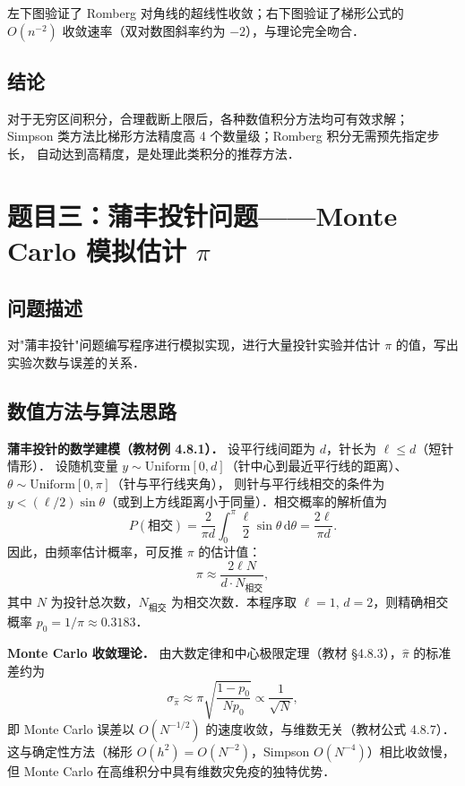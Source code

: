 \documentclass[UTF8,a4paper,11pt]{article}
\begin{document}
左下图验证了 Romberg 对角线的超线性收敛；右下图验证了梯形公式的 $O(n^{-2})$ 收敛速率（双对数图斜率约为 $-2$），与理论完全吻合．

\subsection{结论}

对于无穷区间积分，合理截断上限后，各种数值积分方法均可有效求解；
Simpson 类方法比梯形方法精度高 4 个数量级；Romberg 积分无需预先指定步长，
自动达到高精度，是处理此类积分的推荐方法．

\clearpage

\section{题目三：蒲丰投针问题——Monte Carlo 模拟估计 $\pi$}

\subsection{问题描述}

对"蒲丰投针"问题编写程序进行模拟实现，进行大量投针实验并估计 $\pi$ 的值，写出实验次数与误差的关系．

\subsection{数值方法与算法思路}

\noindent\textbf{蒲丰投针的数学建模（教材例 4.8.1）．}
设平行线间距为 $d$，针长为 $\ell\leq d$（短针情形）．
设随机变量 $y\sim\mathrm{Uniform}[0,d]$（针中心到最近平行线的距离）、$\theta\sim\mathrm{Uniform}[0,\pi]$（针与平行线夹角），
则针与平行线相交的条件为 $y<(\ell/2)\sin\theta$（或到上方线距离小于同量）．相交概率的解析值为
$$P(\text{相交}) = \frac{2}{\pi d}\int_0^{\pi}\frac{\ell}{2}\sin\theta\,\mathrm{d}\theta = \frac{2\ell}{\pi d}.$$
因此，由频率估计概率，可反推 $\pi$ 的估计值：
$$\pi \approx \frac{2\ell N}{d\cdot N_{\text{相交}}},$$
其中 $N$ 为投针总次数，$N_{\text{相交}}$ 为相交次数．本程序取 $\ell=1,\,d=2$，则精确相交概率 $p_0=1/\pi\approx 0.3183$．

\noindent\textbf{Monte Carlo 收敛理论．}
由大数定律和中心极限定理（教材 §4.8.3），$\hat{\pi}$ 的标准差约为
$$\sigma_{\hat{\pi}} \approx \pi\sqrt{\frac{1-p_0}{Np_0}}\propto \frac{1}{\sqrt{N}},$$
即 Monte Carlo 误差以 $O(N^{-1/2})$ 的速度收敛，与维数无关（教材公式 4.8.7）．
这与确定性方法（梯形 $O(h^2)=O(N^{-2})$，Simpson $O(N^{-4})$）相比收敛慢，
但 Monte Carlo 在高维积分中具有维数灾免疫的独特优势．
\end{document}
